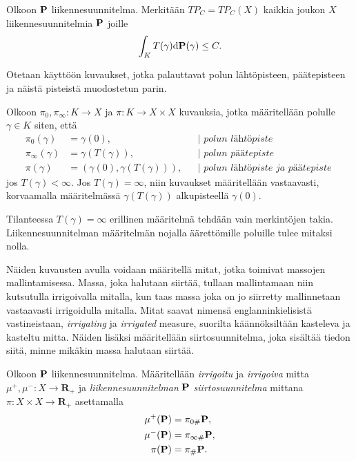 \documentclass[12pt,oneside,a4paper]{amsbook} %
\begin{document}
\begin{definition}
    Olkoon $\P$ liikennesuunnitelma. Merkitään $TP_C = TP_C(X)$ kaikkia joukon $X$ liikennesuunnitelmia $\P$ joille
    \begin{equation*}
        \int_K T(\gamma) \d \P(\gamma) \le C.
    \end{equation*}
\end{definition}

Otetaan käyttöön kuvaukset, jotka palauttavat polun lähtöpisteen, päätepisteen ja näistä pisteistä muodostetun parin.

\begin{definition}
    Olkoon $\pi_0, \pi_\infty: K\to X$ ja $\pi:K\to X \times X$ kuvauksia, jotka määritellään polulle $\gamma \in K$ siten, että 
    \begin{align*}
        \pi_0(\gamma) &= \gamma(0), &&\Big| \textit{ polun lähtöpiste }\\
        \pi_\infty(\gamma) &= \gamma(T(\gamma)), &&\Big| \textit{ polun päätepiste }\\
        \pi(\gamma) &= (\gamma(0), \gamma(T(\gamma))), &&\Big| \textit{ polun lähtöpiste ja päätepiste }
    \end{align*}
    jos $T(\gamma) < \infty$. Jos $T(\gamma) = \infty$, niin kuvaukset määritellään vastaavasti, korvaamalla määritelmässä $\gamma(T(\gamma))$ alkupisteellä $\gamma(0).$
\end{definition}
Tilanteessa $T(\gamma) = \infty$ erillinen määritelmä tehdään vain merkintöjen takia. Liikennesuunnitelman määritelmän nojalla äärettömille poluille tulee mitaksi nolla.

Näiden kuvausten avulla voidaan määritellä mitat, jotka toimivat massojen mallintamisessa. Massa, joka halutaan siirtää, tullaan mallintamaan niin kutsutulla irrigoivalla mitalla, kun taas massa joka on jo siirretty mallinnetaan vastaavasti irrigoidulla mitalla. Mitat saavat nimensä englanninkielisistä vastineistaan, \textit{irrigating} ja \textit{irrigated} measure, suorilta käännöksiltään kasteleva ja kasteltu mitta. Näiden lisäksi määritellään siirtosuunnitelma, joka sisältää tiedon siitä, minne mikäkin massa halutaan siirtää.

\begin{definition}
    Olkoon $\P$ liikennesuunnitelma. Määritellään \textit{irrigoitu} ja \textit{irrigoiva} mitta $\mu^+, \mu^- : X \to \mathbf{R}_+$ ja \textit{liikennesuunnitelman} $\P$ \textit{siirtosuunnitelma} mittana $\pi: X\times X \to \mathbf{R}_+$ asettamalla 
    \begin{align*}
        \mu^+(\P) &= \pi_{0\#} \P,  \\
        \mu^-(\P) &= \pi_{\infty \#} \P,  \\
        \pi(\P) &= \pi_\# \P.
    \end{align*}
\end{definition}
\end{document}
